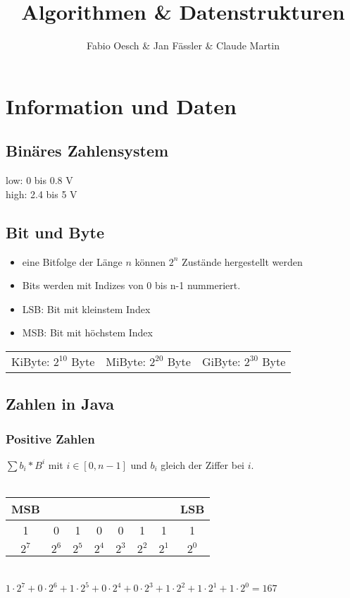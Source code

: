 \documentclass[a4paper,10pt]{article}
\author{Fabio Oesch \& Jan F\"assler  \& Claude Martin}
\title{Algorithmen \& Datenstrukturen}
\begin{document}
\maketitle
\pagebreak
\section{Information und Daten}
\subsection{Bin\"ares Zahlensystem}
low: 0 bis 0.8 V\\
high: 2.4 bis 5 V\\
\subsection{Bit und Byte}
\begin{itemize}
\item eine Bitfolge der L\"ange $n$ k\"onnen $2^n$ Zust\"ande hergestellt werden
\item Bits werden mit Indizes von 0 bis n-1 nummeriert.
\item LSB: Bit mit kleinstem Index
\item MSB: Bit mit h\"ochstem Index
\end{itemize}
\begin{tabular}{l l l }
	KiByte: $2^{10}$ Byte &
	MiByte: $2^{20}$ Byte &
	GiByte: $2^{30}$ Byte
\end{tabular}

\subsection{Zahlen in Java}
\subsubsection{Positive Zahlen}
$\sum {b_i * B^i}$ mit $i \in [0,n-1]$ und $b_i$ gleich der Ziffer bei $i$. \\\\
\begin{tabular}{|c|c|c|c|c|c|c|c|}
\multicolumn{1}{c}{MSB}&\multicolumn{6}{c}{}&\multicolumn{1}{c}{LSB}\\ \hline
1&0&1&0&0&1&1&1\\\hline
\multicolumn{1}{c}{$2^7$}&\multicolumn{1}{c}{$2^6$}&\multicolumn{1}{c}{$2^5$}&\multicolumn{1}{c}{$2^4$}&\multicolumn{1}{c}{$2^3$}&\multicolumn{1}{c}{$2^2$}&\multicolumn{1}{c}{$2^1$}&\multicolumn{1}{c}{$2^0$}\\
\end{tabular}\\
$1\cdot 2^7+0\cdot 2^6+1\cdot 2^5+0\cdot 2^4+0\cdot 2^3+1\cdot 2^2+1\cdot 2^1+1\cdot 2^0=167$
\end{document}
